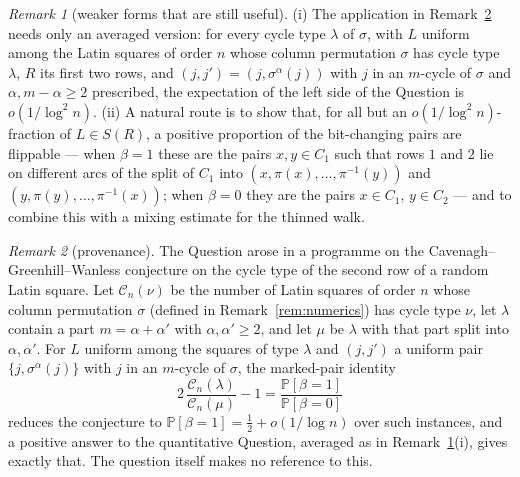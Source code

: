 \documentclass[11pt]{amsart}
\theoremstyle{remark}
\newtheorem{remark}{Remark}
\renewcommand{\Pr}{\mathbb{P}}
\newcommand{\CC}{\mathcal C}
\begin{document}
\begin{remark}[weaker forms that are still useful]\label{rem:weaker}
(i) The application in Remark~\ref{rem:provenance} needs only an
averaged version: for every cycle type $\lambda$ of $\sigma$, with $L$
uniform among the Latin squares of order $n$ whose column permutation
$\sigma$ has cycle type $\lambda$, $R$ its first two rows, and
$(j,j')=(j,\sigma^\alpha(j))$ with $j$ in an $m$-cycle of $\sigma$
and $\alpha,m-\alpha\ge2$ prescribed, the expectation of the left
side of the Question is $o(1/\log^2n)$.  (ii) A natural route is to
show that, for all but an $o(1/\log^2n)$-fraction of $L\in S(R)$, a
positive proportion of the bit-changing pairs are flippable --- when
$\beta=1$ these are the pairs $x,y\in C_1$ such that rows $1$ and $2$
lie on different arcs of the split of $C_1$ into
$(x,\pi(x),\dots,\pi^{-1}(y))$ and $(y,\pi(y),\dots,\pi^{-1}(x))$;
when $\beta=0$ they are the pairs $x\in C_1$, $y\in C_2$ --- and to
combine this with a mixing estimate for the thinned walk.
\end{remark}

\begin{remark}[provenance]\label{rem:provenance}
The Question arose in a programme on the Cavenagh--Greenhill--Wanless
conjecture on the cycle type of the second row of a random Latin
square.  Let $\CC_n(\nu)$ be the number of Latin squares of order $n$
whose column permutation $\sigma$ (defined in
Remark~\ref{rem:numerics}) has cycle type $\nu$, let $\lambda$ contain
a part $m=\alpha+\alpha'$ with $\alpha,\alpha'\ge2$, and let $\mu$ be
$\lambda$ with that part split into $\alpha,\alpha'$.  For $L$
uniform among the squares of type $\lambda$ and $(j,j')$ a uniform
pair $\{j,\sigma^\alpha(j)\}$ with $j$ in an $m$-cycle of $\sigma$,
the marked-pair identity
\[
2\,\frac{\CC_n(\lambda)}{\CC_n(\mu)}-1=\frac{\Pr[\beta=1]}{\Pr[\beta=0]}
\]
reduces the conjecture to $\Pr[\beta=1]=\tfrac12+o(1/\log n)$ over
such instances, and a positive answer to the quantitative Question,
averaged as in Remark~\ref{rem:weaker}(i), gives exactly that.  The
question itself makes no reference to this.
\end{remark}
\end{document}
